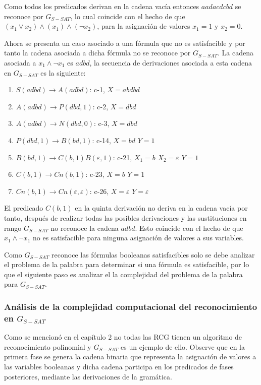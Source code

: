 \documentclass[12pt]{article}
\begin{document}
Como todos los predicados derivan en la cadena vacía entonces $aadacdcbd$ se reconoce por $G_{S-SAT}$,
lo cual coincide con el hecho de que $(x_1 \vee x_2) \wedge (x_1) \wedge (\neg x_2)$, para la asignación
de valores $x_1=1$ y $x_2=0$.

Ahora se presenta un caso asociado a una fórmula que no es satisfacible y por tanto la cadena asociada
a dicha fórmula no se reconoce por $G_{S-SAT}$. La cadena asociada a $x_1 \wedge \neg x_1$ es $adbd$,
la secuencia de derivaciones asociada a esta cadena en $G_{S-SAT}$ es la siguiente:

\begin{enumerate}
    \item $S(adbd)\to A(adbd)$: c-1, $X=abdbd$
    \item $A(adbd)\to P(dbd,1)$: c-2, $X=dbd$
    \item $A(adbd)\to N(dbd,0)$: c-3, $X=dbd$
    \item $P(dbd,1) \to B(bd,1)$: c-14, $X=bd$ $Y=1$
    \item $B(bd,1)\to C(b,1) B(\varepsilon,1)$: c-21, $X_1=b$ $X_2=\varepsilon$ $Y=1$
    \item $C(b,1)\to Cn(b,1)$: c-23, $X=b$ $Y=1$
    \item $Cn(b,1)\to Cn(\varepsilon,\varepsilon)$: c-26, $X=\varepsilon$ $Y=\varepsilon$
\end{enumerate}

El predicado $C(b,1)$ en la quinta derivación no deriva en la cadena vacía por tanto, después de realizar
todas las posibles derivaciones y las sustituciones en rango $G_{S-SAT}$ no reconoce la cadena $adbd$.
Esto coincide con el hecho de que $x_1 \wedge \neg x_1$ no es satisfacible para ninguna asignación de
valores a sus variables.

Como $G_{S-SAT}$ reconoce las fórmulas booleanas satisfacibles solo se debe analizar el problema de la
palabra para determinar si una fórmula es satisfacible, por lo que el siguiente paso es analizar el la
complejidad del problema de la palabra para $G_{S-SAT}$.

\subsubsection{Análisis de la complejidad computacional del reconocimiento en $G_{S-SAT}$}

Como se mencionó en el capítulo 2 no todas las RCG tienen un algoritmo de reconocimiento polinomial y
$G_{S-SAT}$ es un ejemplo de ello. Observe que en la primera fase se genera la cadena binaria que representa
la asignación de valores a las variables booleanas y dicha cadena participa en los predicados de fases
posteriores, mediante las derivaciones de la gramática.
\end{document}
